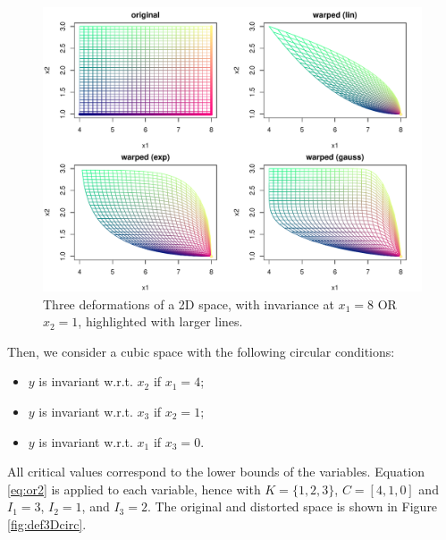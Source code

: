 \begin{figure}[!ht]
\centering
 \includegraphics[width=.8\textwidth]{def2DOR.pdf}
 \caption{Three deformations of a 2D space, with invariance at $x_1=8$ OR $x_2=1$, highlighted with larger lines.}\label{fig:def2DOR}
\end{figure}
% 
% 

Then, we consider a cubic space with the following circular conditions:
\begin{itemize}
 \item $y$ is invariant w.r.t. $x_2$ if $x_1=4$;
 \item $y$ is invariant w.r.t. $x_3$ if $x_2=1$;
 \item $y$ is invariant w.r.t. $x_1$ if $x_3=0$.
\end{itemize}
All critical values correspond to the lower bounds of the variables.
Equation \ref{eq:or2} is applied to each variable, hence with $K=\{1,2,3\}$, $C=[4,1,0]$ and $I_1=3$, $I_2=1$, and $I_3=2$. 
The original and distorted space is shown in Figure \ref{fig:def3Dcirc}.

